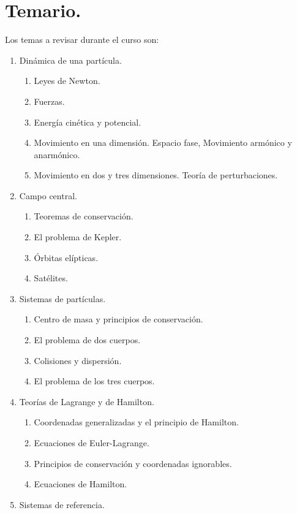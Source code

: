 \documentclass[hidelinks,12pt]{article}
\begin{document}
\section{Temario.}

Los temas a revisar durante el curso son:
\begin{enumerate}
\item Dinámica de una partícula.
\begin{enumerate}
    \item Leyes de Newton.
    \item Fuerzas.
    \item Energía cinética y potencial.
    \item Movimiento en una dimensión. Espacio fase, Movimiento armónico y anarmónico.
    \item Movimiento en dos y tres dimensiones. Teoría de perturbaciones.
\end{enumerate}
\item Campo central.
\begin{enumerate}
    \item Teoremas de conservación.
    \item El problema de Kepler.
    \item Órbitas elípticas.
    \item Satélites.
\end{enumerate}
\item Sistemas de partículas.
\begin{enumerate}
    \item Centro de masa y principios de conservación.
    \item El problema de dos cuerpos.
    \item Colisiones y dispersión.
    \item El problema de los tres cuerpos.
\end{enumerate}
\item Teorías de Lagrange y de Hamilton.
\begin{enumerate}
    \item Coordenadas generalizadas y el principio de Hamilton.
    \item Ecuaciones de Euler-Lagrange.
    \item Principios de conservación y coordenadas ignorables.
    \item Ecuaciones de Hamilton.
\end{enumerate}
\item Sistemas de referencia.
\begin{enumerate}

\end{enumerate}
\end{enumerate}
\end{document}
